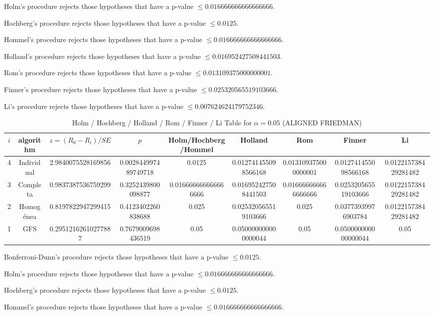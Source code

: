 \documentclass[a4paper,10pt]{article}
\begin{document}
\begin{landscape}
Holm's procedure rejects those hypotheses that have a p-value $\le0.016666666666666666$.


Hochberg's procedure rejects those hypotheses that have a p-value $\le0.0125$.


Hommel's procedure rejects those hypotheses that have a p-value $\le0.016666666666666666$.


Holland's procedure rejects those hypotheses that have a p-value $\le0.016952427508441503$.


Rom's procedure rejects those hypotheses that have a p-value $\le0.013109375000000001$.


Finner's procedure rejects those hypotheses that have a p-value $\le0.025320565519103666$.


Li's procedure rejects those hypotheses that have a p-value $\le0.007624624179752346$.



\newpage

\begin{table}[!htp]
\centering\scriptsize
\caption{Holm / Hochberg / Holland / Rom / Finner / Li Table for $\alpha=0.05$ (ALIGNED FRIEDMAN)}
\begin{tabular}{ccccccccc}
$i$&algorithm&$z=(R_0 - R_i)/SE$&$p$&Holm/Hochberg/Hommel&Holland&Rom&Finner&Li\\
\hline
4&Individual&2.9840075528169856&0.002844997489749718&0.0125&0.012741455098566168&0.013109375000000001&0.012741455098566168&0.012215738429281482\\
3&Completa&0.9837387536759299&0.3252439800098877&0.016666666666666666&0.016952427508441503&0.016666666666666666&0.025320565519103666&0.012215738429281482\\
2&Homogénea&0.8197822947299415&0.4123402260838688&0.025&0.025320565519103666&0.025&0.03773939976903784&0.012215738429281482\\
1&GFS&0.29512162610277887&0.7679009698436519&0.05&0.050000000000000044&0.05&0.050000000000000044&0.05\\
\hline
\end{tabular}
\end{table}
Bonferroni-Dunn's procedure rejects those hypotheses that have a p-value $\le0.0125$.


Holm's procedure rejects those hypotheses that have a p-value $\le0.016666666666666666$.


Hochberg's procedure rejects those hypotheses that have a p-value $\le0.0125$.


Hommel's procedure rejects those hypotheses that have a p-value $\le0.016666666666666666$.



\end{landscape}
\end{document}
